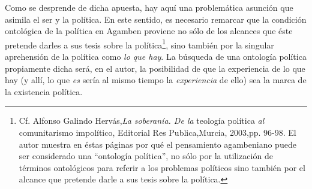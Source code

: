 Como se desprende de dicha apuesta, hay aquí una problemática asunción que asimila el ser y la política. En este sentido, es necesario remarcar que la condición ontológica de la política en Agamben proviene no sólo de los alcances que éste pretende darles a sus tesis sobre la política\footnote{Cf. Alfonso Galindo Hervás,\emph{La soberanía. De la} teología política \emph{al} comunitarismo impolítico, Editorial Res Publica,Murcia, 2003,pp. 96-98. El autor muestra en éstas páginas por qué el pensamiento agambeniano puede ser considerado una \enquote{ontología política}, no sólo por la utilización de términos ontológicos para referir a los problemas políticos sino también por el alcance que pretende darle a sus tesis sobre la política.}, sino también por la singular aprehensión de la política como \emph{lo que hay}. La búsqueda de una ontología política propiamente dicha será, en el autor, la posibilidad de que la experiencia de lo que hay (y allí, lo que \emph{es} sería al mismo tiempo la \emph{experiencia} de ello) sea la marca de la existencia política.

